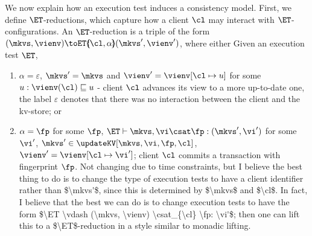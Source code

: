 We now explain how an execution test induces a consistency model. First, 
we define $\ET$-reductions, which capture how a client $\cl$ may interact with $\ET$-configurations. 
An $\ET$-reduction is a triple of the form $(\mkvs, \vienv) \toET{\hspace{-5pt}(\cl, \alpha)\hspace{-5pt}} (\mkvs', \vienv')$, 
where either 
Given an execution test  $\ET$, %
\begin{enumerate}
	\item $\alpha = \varepsilon$, $\mkvs' = \mkvs$ and $\vienv' = \vienv[\cl \mapsto u]$ for some $u: \vienv(\cl) \sqsubseteq u$ - 
	client $\cl$ advances its view to a more up-to-date one, the label $\varepsilon$ denotes that there was no interaction between the client and the kv-store; or 
	\item $\alpha = \fp$ for some $\fp$, $\ET \vdash \mkvs, \vi \csat \fp : (\mkvs', \vi')$ for some $\vi'$, $\mkvs' \in \updateKV[\mkvs, \vi, \fp, \cl]$, 
	$\vienv' = \vienv[\cl \mapsto \vi']$; client $\cl$ 
	commits a transaction with fingerprint $\fp$.
	\ac{Not changing due to time constraints, but I believe the best thing to do is to change the type of execution tests to have a client identifier 
	rather than $\mkvs'$, since this is determined by $\mkvs$ and $\cl$. In fact, I believe that the best we can do is to change execution tests to 
	have the form $\ET \vdash (\mkvs, \vienv) \csat_{\cl} \fp: \vi'$; then one can lift this to a $\ET$-reduction in a style similar to monadic lifting.}
\end{enumerate}

